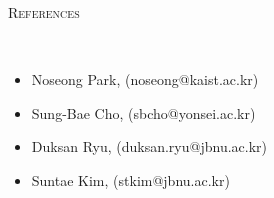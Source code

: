 \documentclass[10pt]{article}
\newenvironment{changemargin}[2]{
  \begin{list}{}{
    \setlength{\topsep}{0pt}
    \setlength{\leftmargin}{#1}
    \setlength{\rightmargin}{#2}
    \setlength{\listparindent}{\parindent}
    \setlength{\itemindent}{\parindent}
    \setlength{\parsep}{\parskip}
  }
  \item[]}{\end{list}
}
\newcommand{\lineover}{
	\begin{changemargin}{-0.05in}{-0.05in}
		\vspace*{-8pt}
		\hrulefill \\
		\vspace*{-2pt}
	\end{changemargin}
}
\newcommand{\header}[1]{
	\begin{changemargin}{-0.5in}{-0.5in}
		\scshape{#1}\\
  	\lineover
	\end{changemargin}
}
\newcommand{\labdescription}[1]{
	\begin{changemargin}{0.15in}{0.15in}
    \smallskip
		{#1}
    \medskip
	\end{changemargin}
}
\newcommand{\labtitle}[3]{
	\textbf{#1}, \emph{#2} \hfill \emph{#3}\\
}
\newenvironment{body} {
	\vspace*{-16pt}
	\begin{changemargin}{-0.25in}{-0.5in}
  }
	{\end{changemargin}
}
\begin{document}
\medskip

\header{References}

\begin{body}
	\vspace{14pt}
    \begin{itemize}
        \item Noseong Park, (noseong@kaist.ac.kr)
        \item Sung-Bae Cho, (sbcho@yonsei.ac.kr)
        \item Duksan Ryu, (duksan.ryu@jbnu.ac.kr)
        \item Suntae Kim, (stkim@jbnu.ac.kr)
    \end{itemize}
\end{body}



  

  
\end{document}
